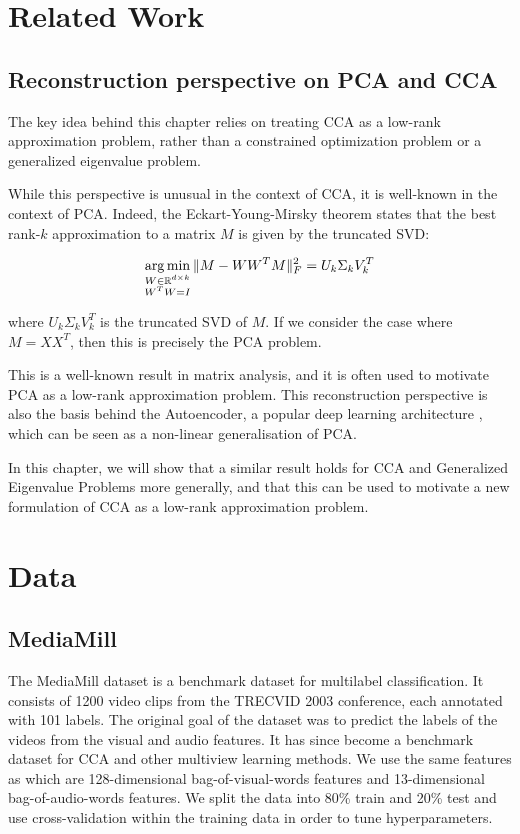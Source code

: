 \section{Related Work}
\subsection{Reconstruction perspective on PCA and CCA}
The key idea behind this chapter relies on treating CCA as a low-rank approximation problem, rather than a constrained optimization problem or a generalized eigenvalue problem.

While this perspective is unusual in the context of CCA, it is well-known in the context of PCA. Indeed, the Eckart-Young-Mirsky theorem \cite{stewart_matrix_1990} states that the best rank-$k$ approximation to a matrix $M$ is given by the truncated SVD:

\begin{align}
    \operatorname*{arg\,min}_{\substack{W \in \mathbb{R}^{d \times k} \\ W^T W = I}} \| M - W W^T M \|_F^2 = U_k \Sigma_k V_k^T
\end{align}

where $U_k \Sigma_k V_k^T$ is the truncated SVD of $M$. If we consider the case where $M=XX^T$, then this is precisely the PCA problem. 

This is a well-known result in matrix analysis, and it is often used to motivate PCA as a low-rank approximation problem. 
This reconstruction perspective is also the basis behind the Autoencoder, a popular deep learning architecture \cite{goodfellow2016deep}, which can be seen as a non-linear generalisation of PCA. 

In this chapter, we will show that a similar result holds for CCA and Generalized Eigenvalue Problems more generally, and that this can be used to motivate a new formulation of CCA as a low-rank approximation problem.

\section{Data}
\subsection{MediaMill}
The MediaMill dataset \cite{feng2004context} is a benchmark dataset for multilabel classification. It consists of 1200 video clips from the TRECVID 2003 conference, each annotated with 101 labels. The original goal of the dataset was to predict the labels of the videos from the visual and audio features. It has since become a benchmark dataset for CCA and other multiview learning methods. We use the same features as \cite{gemp2022generalized} which are 128-dimensional bag-of-visual-words features and 13-dimensional bag-of-audio-words features. We split the data into 80\% train and 20\% test and use cross-validation within the training data in order to tune hyperparameters.

